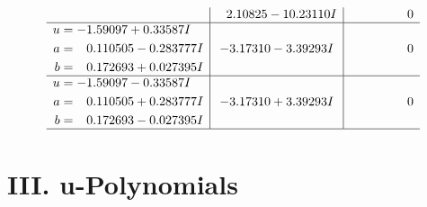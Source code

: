\documentclass[1p]{elsarticle_modified}
\theoremstyle{definition}
\begin{document}
$$\begin{array}{c|c|c}
 & \phantom{-}2.10825 - 10.23110 I & \phantom{-0.000000 } 0 \\ \hline\begin{aligned}
u &= -1.59097 + 0.33587 I \\
a &= \phantom{-}0.110505 - 0.283777 I \\
b &= \phantom{-}0.172693 + 0.027395 I\end{aligned}
 & -3.17310 - 3.39293 I & \phantom{-0.000000 } 0 \\ \hline\begin{aligned}
u &= -1.59097 - 0.33587 I \\
a &= \phantom{-}0.110505 + 0.283777 I \\
b &= \phantom{-}0.172693 - 0.027395 I\end{aligned}
 & -3.17310 + 3.39293 I & \phantom{-0.000000 } 0\\
 \hline 
 \end{array}$$\newpage
\newpage\renewcommand{\arraystretch}{1}
\centering \section*{ III. u-Polynomials}
\end{document}
